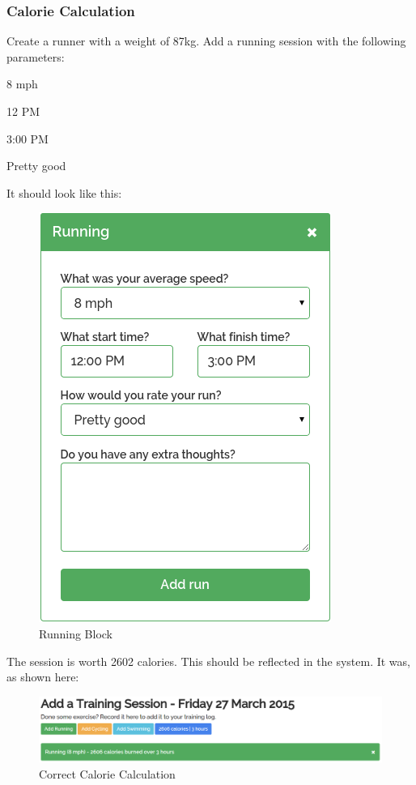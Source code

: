 \documentclass{article}[12pt,a4paper]
\begin{document}
{\clearpage

\subsubsection{Calorie Calculation}
Create a runner with a weight of 87kg. Add a running session with the following parameters:

\begin{description}[labelindent=1cm]
  \item[Speed:] 8 mph
  \item[Start time:] 12 PM
  \item[Finish time:] 3:00 PM
  \item[Rating:] Pretty good
\end{description}

It should look like this:

\begin{figure}[h!]
    \includegraphics[scale=0.33]{images/testing/calorie/running}
    \caption{Running Block}
\end{figure}

The session is worth 2602 calories. This should be reflected in the system. It was, as shown here:

\begin{figure}[h!]
    \includegraphics[scale=0.33]{images/testing/calorie/finished}
    \caption{Correct Calorie Calculation}
\end{figure}

}
\end{document}
